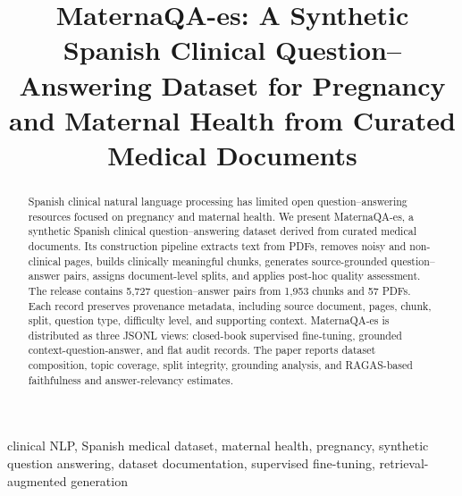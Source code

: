 \documentclass[conference]{IEEEtran}
\begin{document}
\title{MaternaQA-es: A Synthetic Spanish Clinical Question--Answering Dataset for Pregnancy and Maternal Health from Curated Medical Documents}

\author{
\and
{}
}

\maketitle

\begin{abstract}
Spanish clinical natural language processing has limited open question--answering resources focused on pregnancy and maternal health. We present MaternaQA-es, a synthetic Spanish clinical question--answering dataset derived from curated medical documents. Its construction pipeline extracts text from PDFs, removes noisy and non-clinical pages, builds clinically meaningful chunks, generates source-grounded question--answer pairs, assigns document-level splits, and applies post-hoc quality assessment. The release contains 5,727 question--answer pairs from 1,953 chunks and 57 PDFs. Each record preserves provenance metadata, including source document, pages, chunk, split, question type, difficulty level, and supporting context. MaternaQA-es is distributed as three JSONL views: closed-book supervised fine-tuning, grounded context-question-answer, and flat audit records. The paper reports dataset composition, topic coverage, split integrity, grounding analysis, and RAGAS-based faithfulness and answer-relevancy estimates.
\end{abstract}

\begin{IEEEkeywords}
clinical NLP, Spanish medical dataset, maternal health, pregnancy, synthetic question answering, dataset documentation, supervised fine-tuning, retrieval-augmented generation
\end{IEEEkeywords}
\end{document}
